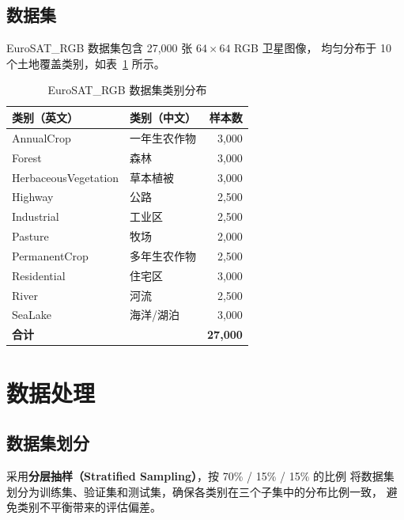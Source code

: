 \documentclass[12pt, a4paper]{article}
\begin{document}
\subsection{数据集}

EuroSAT\_RGB 数据集包含 27,000 张 $64\times64$ RGB 卫星图像，
均匀分布于 10 个土地覆盖类别，如表~\ref{tab:dataset} 所示。

\begin{table}[H]
  \centering
  \caption{EuroSAT\_RGB 数据集类别分布}
  \label{tab:dataset}
  \begin{tabular}{llr}
    \toprule
    \textbf{类别（英文）} & \textbf{类别（中文）} & \textbf{样本数} \\
    \midrule
    AnnualCrop           & 一年生农作物   & 3{,}000 \\
    Forest               & 森林           & 3{,}000 \\
    HerbaceousVegetation & 草本植被       & 3{,}000 \\
    Highway              & 公路           & 2{,}500 \\
    Industrial           & 工业区         & 2{,}500 \\
    Pasture              & 牧场           & 2{,}000 \\
    PermanentCrop        & 多年生农作物   & 2{,}500 \\
    Residential          & 住宅区         & 3{,}000 \\
    River                & 河流           & 2{,}500 \\
    SeaLake              & 海洋/湖泊      & 3{,}000 \\
    \midrule
    \multicolumn{2}{l}{\textbf{合计}} & \textbf{27{,}000} \\
    \bottomrule
  \end{tabular}
\end{table}

\section{数据处理}

\subsection{数据集划分}

采用\textbf{分层抽样（Stratified Sampling）}，按 70\% / 15\% / 15\% 的比例
将数据集划分为训练集、验证集和测试集，确保各类别在三个子集中的分布比例一致，
避免类别不平衡带来的评估偏差。
\end{document}
